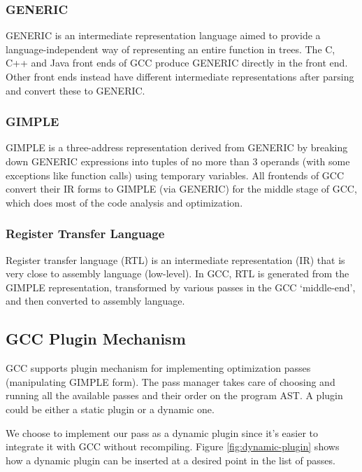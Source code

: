 \subsubsection{GENERIC}
GENERIC\cite{generic} is an intermediate representation language aimed to provide a language-independent way of representing an entire function in trees. The C, C++ and Java front ends of GCC produce GENERIC directly in the front end. Other front ends instead have different intermediate representations after parsing and convert these to GENERIC.
\subsubsection{GIMPLE}
GIMPLE\cite{gimple} is a three-address representation derived from GENERIC by breaking down GENERIC expressions into tuples of no more than 3 operands (with some exceptions like function calls) using temporary variables. All frontends of GCC convert their IR forms to GIMPLE (via GENERIC) for the middle stage of GCC, which does most of the code analysis and optimization.
\subsubsection{Register Transfer Language}
Register transfer language (RTL)\cite{rtl} is an intermediate representation (IR) that is very close to assembly language (low-level). In GCC, RTL is generated from the GIMPLE representation, transformed by various passes in the GCC `middle-end', and then converted to assembly language.

\subsection{GCC Plugin Mechanism}
GCC supports plugin mechanism for implementing optimization passes (manipulating GIMPLE form). The pass manager takes care of choosing and running all the available passes and their order on the program AST. A plugin could be either a static plugin or a dynamic one.

We choose to implement our pass as a dynamic plugin since it's easier to integrate it with GCC without recompiling. Figure \ref{fig:dynamic-plugin} shows how a dynamic plugin can be inserted at a desired point in the list of passes.

